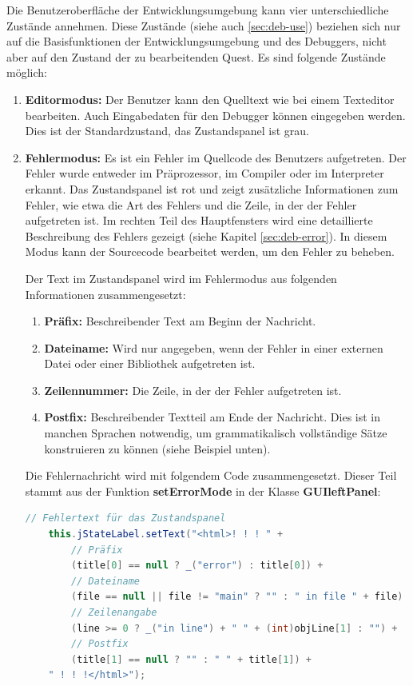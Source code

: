 Die Benutzeroberfläche der Entwicklungsumgebung kann vier unterschiedliche Zustände annehmen. Diese Zustände (siehe auch \ref{sec:deb-use}) beziehen sich nur auf die Basisfunktionen der Entwicklungsumgebung und des Debuggers, nicht aber auf den Zustand der zu bearbeitenden Quest. Es sind folgende Zustände möglich:
\begin{enumerate}
\item \textbf{Editormodus:} Der Benutzer kann den Quelltext wie bei einem Texteditor bearbeiten. Auch Eingabedaten für den Debugger können eingegeben werden. Dies ist der Standardzustand, das Zustandspanel ist grau.
\item \textbf{Fehlermodus:} Es ist ein Fehler im Quellcode des Benutzers aufgetreten. Der Fehler wurde entweder im Präprozessor, im Compiler oder im Interpreter erkannt. Das Zustandspanel ist rot und zeigt zusätzliche Informationen zum Fehler, wie etwa die Art des Fehlers und die Zeile, in der der Fehler aufgetreten ist. Im rechten Teil des Hauptfensters wird eine detaillierte Beschreibung des Fehlers gezeigt (siehe Kapitel \ref{sec:deb-error}). In diesem Modus kann der Sourcecode bearbeitet werden, um den Fehler zu beheben.

Der Text im Zustandspanel wird im Fehlermodus aus folgenden Informationen zusammengesetzt:
\begin{enumerate}
\item \textbf{Präfix:} Beschreibender Text am Beginn der Nachricht.
\item \textbf{Dateiname:} Wird nur angegeben, wenn der Fehler in einer externen Datei oder einer Bibliothek aufgetreten ist.
\item \textbf{Zeilennummer:} Die Zeile, in der der Fehler aufgetreten ist.
\item \textbf{Postfix:} Beschreibender Textteil am Ende der Nachricht. Dies ist in manchen Sprachen notwendig, um grammatikalisch vollständige Sätze konstruieren zu können (siehe Beispiel unten).
\end{enumerate}

Die Fehlernachricht wird mit folgendem Code zusammengesetzt. Dieser Teil stammt aus der Funktion \textbf{setErrorMode} in der Klasse \textbf{GUIleftPanel}:

\begin{lstlisting}[language=JAVA]
	// Fehlertext für das Zustandspanel
	this.jStateLabel.setText("<html>! ! ! " +
		// Präfix
		(title[0] == null ? _("error") : title[0]) +
		// Dateiname
		(file == null || file != "main" ? "" : " in file " + file) + " " +
		// Zeilenangabe
		(line >= 0 ? _("in line") + " " + (int)objLine[1] : "") +
		// Postfix
		(title[1] == null ? "" : " " + title[1]) +
	" ! ! !</html>");
\end{lstlisting}


\end{enumerate}
